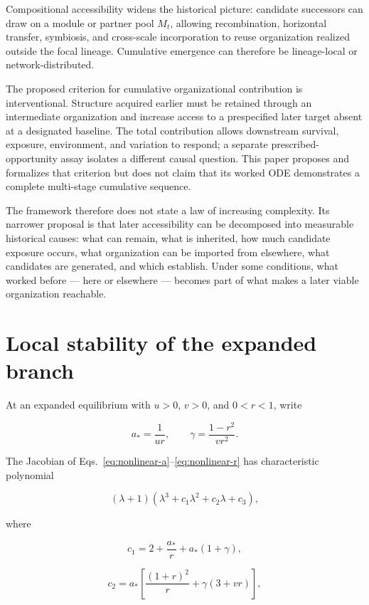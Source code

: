 \documentclass[11pt,a4paper]{article}
\begin{document}
Compositional accessibility widens the historical picture: candidate successors can draw on a module or partner pool $M_t$, allowing recombination, horizontal transfer, symbiosis, and cross-scale incorporation to reuse organization realized outside the focal lineage. Cumulative emergence can therefore be lineage-local or network-distributed.

The proposed criterion for cumulative organizational contribution is interventional. Structure acquired earlier must be retained through an intermediate organization and increase access to a prespecified later target absent at a designated baseline. The total contribution allows downstream survival, exposure, environment, and variation to respond; a separate prescribed-opportunity assay isolates a different causal question. This paper proposes and formalizes that criterion but does not claim that its worked ODE demonstrates a complete multi-stage cumulative sequence.

The framework therefore does not state a law of increasing complexity. Its narrower proposal is that later accessibility can be decomposed into measurable historical causes: what can remain, what is inherited, how much candidate exposure occurs, what organization can be imported from elsewhere, what candidates are generated, and which establish. Under some conditions, what worked before --- here or elsewhere --- becomes part of what makes a later viable organization reachable.

\appendix
\section{Local stability of the expanded branch}
\label{app:stability}

At an expanded equilibrium with $u>0$, $v>0$, and $0<r<1$, write

\[
a_*=\frac{1}{ur},
\qquad
\gamma=\frac{1-r^2}{vr^2}.
\]

The Jacobian of Eqs.~\eqref{eq:nonlinear-a}--\eqref{eq:nonlinear-r} has characteristic polynomial

\begin{equation}
(\lambda+1)\left(\lambda^3+c_1\lambda^2+c_2\lambda+c_3\right),
\label{eq:charpoly}
\end{equation}

where

\[
c_1=2+\frac{a_*}{r}+a_*(1+\gamma),
\]

\[
c_2=a_*\left[\frac{(1+r)^2}{r}+\gamma(3+vr)\right],
\]
\end{document}
